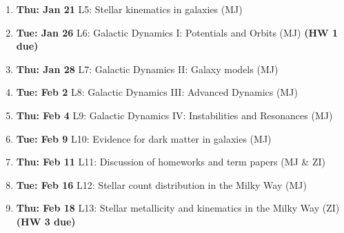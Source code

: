 \documentclass[10pt]{article}
\begin{document}
\begin{enumerate}
  \item {\bf Thu: Jan 21}    L5: Stellar kinematics in galaxies (MJ)

  \item {\bf Tue: Jan 26}    L6: Galactic Dynamics I: Potentials and Orbits (MJ) {\bf (HW 1 due)}

 \item {\bf Thu: Jan 28}     L7: Galactic Dynamics II: Galaxy models (MJ)

  \item {\bf Tue: Feb 2}     L8: Galactic Dynamics III: Advanced Dynamics (MJ)

  \item {\bf Thu: Feb 4}     L9: Galactic Dynamics IV: Instabilities and Resonances (MJ)

  \item {\bf Tue: Feb 9}    L10: Evidence for dark matter in galaxies (MJ)

  \item {\bf Thu: Feb 11}  L11: Discussion of homeworks and term papers (MJ \& ZI) 

  \item {\bf Tue: Feb 16}  L12: Stellar count distribution in the Milky Way (MJ)

  \item {\bf Thu: Feb 18}  L13: Stellar metallicity and kinematics in the Milky Way (ZI) {\bf (HW 3 due)}


\end{enumerate}
\end{document}
